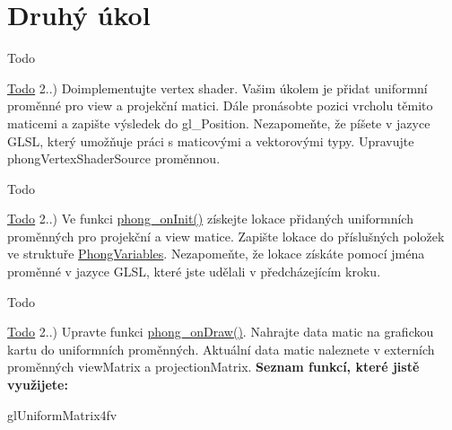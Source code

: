\hypertarget{group__task2}{\section{Druhý úkol}
\label{group__task2}
}
\begin{DoxyRefDesc}{Todo}
\item[\hyperlink{todo__todo000001}{Todo}]2..) Doimplementujte vertex shader. Vašim úkolem je přidat uniformní proměnné pro view a projekční matici. Dále pronásobte pozici vrcholu těmito maticemi a zapište výsledek do gl\-\_\-\-Position. Nezapomeňte, že píšete v jazyce G\-L\-S\-L, který umožňuje práci s maticovými a vektorovými typy. Upravujte phong\-Vertex\-Shader\-Source proměnnou. \end{DoxyRefDesc}
\begin{DoxyRefDesc}{Todo}
\item[\hyperlink{todo__todo000005}{Todo}]2..) Ve funkci \hyperlink{student_8h_ac2adb2ba4e748239b9db4d037584d3cc}{phong\-\_\-on\-Init()} získejte lokace přidaných uniformních proměnných pro projekční a view matice. Zapište lokace do příslušných položek ve struktuře \hyperlink{structPhongVariables}{Phong\-Variables}. Nezapomeňte, že lokace získáte pomocí jména proměnné v jazyce G\-L\-S\-L, které jste udělali v předcházejícím kroku. \end{DoxyRefDesc}


\begin{DoxyRefDesc}{Todo}
\item[\hyperlink{todo__todo000009}{Todo}]2..) Upravte funkci \hyperlink{student_8h_a53ffbb1a271d285abdaf7a029192f47e}{phong\-\_\-on\-Draw()}. Nahrajte data matic na grafickou kartu do uniformních proměnných. Aktuální data matic naleznete v externích proměnných view\-Matrix a projection\-Matrix. {\bfseries Seznam funkcí, které jistě využijete\-:}
\begin{DoxyItemize}
\item gl\-Uniform\-Matrix4fv 
\end{DoxyItemize}\end{DoxyRefDesc}
